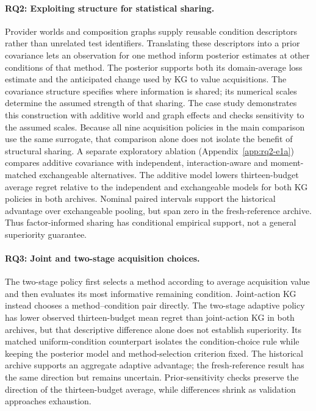 \documentclass[10pt,a4paper]{article}
\begin{document}
\paragraph{RQ2: Exploiting structure for statistical sharing.}
Provider worlds and composition graphs supply reusable condition descriptors rather than unrelated test identifiers. Translating these descriptors into a prior covariance lets an observation for one method inform posterior estimates at other conditions of that method. The posterior supports both its domain-average loss estimate and the anticipated change used by KG to value acquisitions. The covariance structure specifies where information is shared; its numerical scales determine the assumed strength of that sharing. The case study demonstrates this construction with additive world and graph effects and checks sensitivity to the assumed scales. Because all nine acquisition policies in the main comparison use the same surrogate, that comparison alone does not isolate the benefit of structural sharing. A separate exploratory ablation (Appendix~\ref{app:rq2-e1a}) compares additive covariance with independent, interaction-aware and moment-matched exchangeable alternatives. The additive model lowers thirteen-budget average regret relative to the independent and exchangeable models for both KG policies in both archives. Nominal paired intervals support the historical advantage over exchangeable pooling, but span zero in the fresh-reference archive. Thus factor-informed sharing has conditional empirical support, not a general superiority guarantee.

\paragraph{RQ3: Joint and two-stage acquisition choices.}
The two-stage policy first selects a method according to average acquisition value and then evaluates its most informative remaining condition. Joint-action KG instead chooses a method--condition pair directly. The two-stage adaptive policy has lower observed thirteen-budget mean regret than joint-action KG in both archives, but that descriptive difference alone does not establish superiority. Its matched uniform-condition counterpart isolates the condition-choice rule while keeping the posterior model and method-selection criterion fixed. The historical archive supports an aggregate adaptive advantage; the fresh-reference result has the same direction but remains uncertain. Prior-sensitivity checks preserve the direction of the thirteen-budget average, while differences shrink as validation approaches exhaustion.
\end{document}
